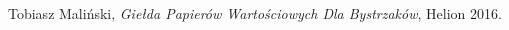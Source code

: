 \documentclass[man,mfi|min|mpt|mok|mub|mza|miz|bsp]{mgrwms}
\begin{document}
%

%

%
%
%
%
% 
\begin{thebibliography}{88}  %

 Tobiasz Maliński, 
\textit{Giełda Papierów Wartościowych Dla Bystrzaków}, Helion 2016.


\end{thebibliography}
%
%  
%
\listoffigures
%
\listoftables
%
\end{document}
